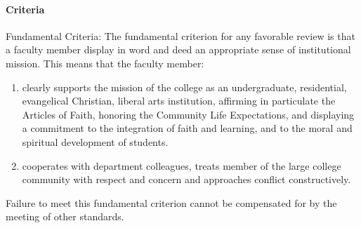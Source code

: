 			\paragraph{Criteria}
				\label{sec:Evaluation-Criteria}
				Fundamental Criteria: The fundamental criterion for any favorable review is that a faculty member display in word and deed an appropriate sense of institutional mission. This means that the faculty member:
				\begin{enumerate}[label=\arabic*)]
					\item{clearly supports the mission of the college as an
						undergraduate, residential, evangelical Christian, liberal arts
						institution, affirming in particulate the Articles of Faith,
						honoring the Community Life Expectations, and displaying a
						commitment to the integration of faith and learning, and to the
						moral and spiritual development of students.}

					\item{cooperates with department colleagues, treats member of
						the large college community with respect and concern and
						approaches conflict constructively.}

				\end{enumerate}
				Failure to meet this fundamental criterion cannot be compensated for by the meeting of other standards.
